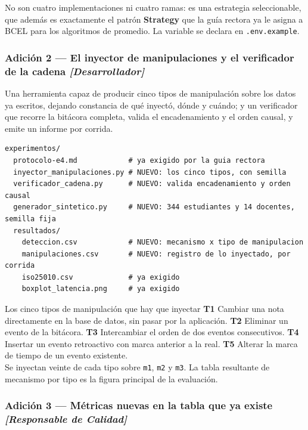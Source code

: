 \documentclass[11pt,a4paper]{article}
\begin{document}
No son cuatro implementaciones ni cuatro ramas: es una estrategia seleccionable, que además es exactamente el patrón \textbf{Strategy} que la guía rectora ya le asigna a BCEL para los algoritmos de promedio. La variable se declara en \texttt{.env.example}.

\subsubsection{Adición 2 --- El inyector de manipulaciones y el verificador de la cadena \emph{[Desarrollador]}}

Una herramienta capaz de producir cinco tipos de manipulación sobre los datos ya escritos, dejando constancia de qué inyectó, dónde y cuándo; y un verificador que recorre la bitácora completa, valida el encadenamiento y el orden causal, y emite un informe por corrida.

\begin{lstlisting}
experimentos/
  protocolo-e4.md            # ya exigido por la guia rectora
  inyector_manipulaciones.py # NUEVO: los cinco tipos, con semilla
  verificador_cadena.py      # NUEVO: valida encadenamiento y orden causal
  generador_sintetico.py     # NUEVO: 344 estudiantes y 14 docentes, semilla fija
  resultados/
    deteccion.csv            # NUEVO: mecanismo x tipo de manipulacion
    manipulaciones.csv       # NUEVO: registro de lo inyectado, por corrida
    iso25010.csv             # ya exigido
    boxplot_latencia.png     # ya exigido
\end{lstlisting}

\begin{defBox}{Los cinco tipos de manipulación que hay que inyectar}
	\textbf{T1} Cambiar una nota directamente en la base de datos, sin pasar por la aplicación. \textbf{T2} Eliminar un evento de la bitácora. \textbf{T3} Intercambiar el orden de dos eventos consecutivos. \textbf{T4} Insertar un evento retroactivo con marca anterior a la real. \textbf{T5} Alterar la marca de tiempo de un evento existente.\\[5pt]
	Se inyectan veinte de cada tipo sobre \texttt{m1}, \texttt{m2} y \texttt{m3}. La tabla resultante de mecanismo por tipo es la figura principal de la evaluación.
\end{defBox}

\subsubsection{Adición 3 --- Métricas nuevas en la tabla que ya existe \emph{[Responsable de Calidad]}}
\end{document}
